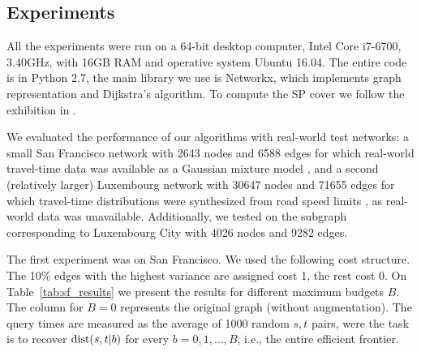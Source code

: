 \subsection{Experiments}

All the experiments were run on a 64-bit desktop computer, Intel Core i7-6700, 3.40GHz,  with 16GB RAM and operative system Ubuntu 16.04.
The entire code is in Python 2.7, the main library we use is Networkx, which implements graph representation and Dijkstra's algorithm.
To compute the SP cover we follow the exhibition in \cite{hubimplem}.

We evaluated the performance of our algorithms with real-world test networks: a small San Francisco network with 2643 nodes and 6588 edges for which real-world travel-time data was available as a Gaussian mixture model \cite{sf_data}, and a second (relatively larger) Luxembourg network with 30647 nodes and 71655 edges for which travel-time distributions were synthesized from road speed limits \cite{niknami2016tractable}, as real-world data was unavailable.
Additionally, we tested on the subgraph corresponding to Luxembourg City with 4026 nodes and 9282 edges.

The first experiment was on San Francisco.
We used the following cost structure.
The 10\% edges with the highest variance are assigned cost 1, the rest cost 0.
On Table~\ref{tab:sf_results} we present the results for different maximum budgets $B$.
The column for $B=0$ represents the original graph (without augmentation).
The query times are measured as the average of 1000 random $s,t$ pairs, were the task is to recover $\text{dist}(s,t|b)$ for every $b=0,1,\ldots,B$, i.e., the entire efficient frontier.

